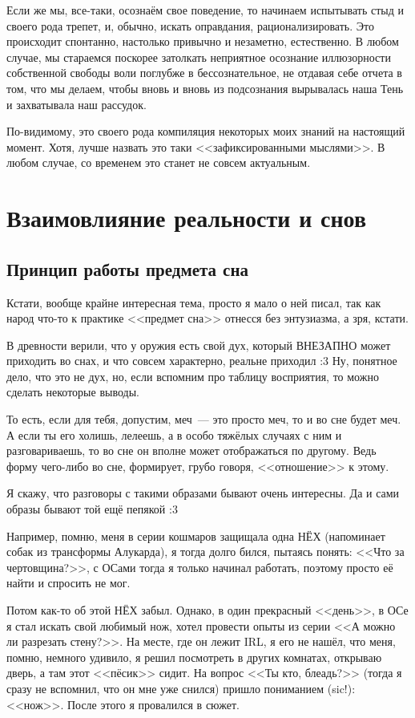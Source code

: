 \documentclass[a5paper,12pt,twoside]{memoir}
\begin{document}
Если же мы, все-таки, осознаём свое поведение, то начинаем испытывать стыд и своего рода трепет, и, обычно, искать оправдания, рационализировать. Это происходит спонтанно, настолько привычно и незаметно, естественно. В любом случае, мы стараемся поскорее затолкать неприятное осознание иллюзорности собственной свободы воли поглубже в бессознательное, не отдавая себе отчета в том, что мы делаем, чтобы вновь и вновь из подсознания вырывалась наша Тень и захватывала наш рассудок.

По-видимому, это своего рода компиляция некоторых моих знаний на настоящий момент. Хотя, лучше назвать это таки <<зафиксированными мыслями>>. В любом случае, со временем это станет не совсем актуальным.



\chapter{Взаимовлияние реальности и снов}



\section{Принцип работы предмета сна}
Кстати, вообще крайне интересная тема, просто я мало о ней писал, так как народ что-то к практике <<предмет сна>> отнесся без энтузиазма, а зря, кстати.

В древности верили, что у оружия есть свой дух, который ВНЕЗАПНО может приходить во снах, и что совсем характерно, реальне приходил :3 Ну, понятное дело, что это не дух, но, если вспомним про таблицу восприятия, то можно сделать некоторые выводы. 

То есть, если для тебя, допустим, меч~--- это просто меч, то и во сне будет меч. А если ты его холишь, лелеешь, а в особо тяжёлых случаях с ним и разговариваешь, то во сне он вполне может отображаться по другому. Ведь форму чего-либо во сне, формирует, грубо говоря, <<отношение>> к этому. 

Я скажу, что разговоры с такими образами бывают очень интересны. Да и сами образы бывают той ещё пепякой :3 

Например, помню, меня в серии кошмаров защищала одна НЁХ (напоминает собак из трансформы Алукарда), я тогда долго бился, пытаясь понять: <<Что за чертовщина?>>, с ОСами тогда я только начинал работать, поэтому просто её найти и спросить не мог. 

Потом как-то об этой НЁХ забыл. Однако, в один прекрасный <<день>>, в ОСе я стал искать свой любимый нож, хотел провести опыты из серии <<А можно ли разрезать стену?>>. На месте, где он лежит IRL, я его не нашёл, что меня, помню, немного удивило, я решил посмотреть в других комнатах, открываю дверь, а там этот <<пёсик>> сидит. На вопрос <<Ты кто, блеадь?>> (тогда я сразу не вспомнил, что он мне уже снился) пришло пониманием (sic!): <<нож>>. После этого я провалился в сюжет.
\end{document}
